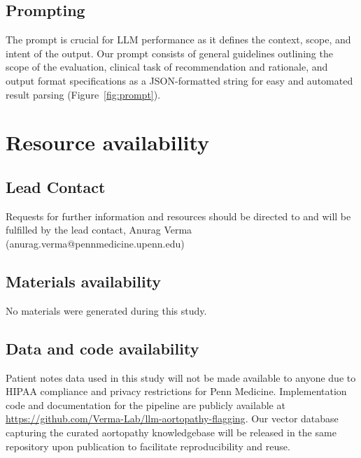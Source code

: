 \documentclass[fleqn,10pt]{wlscirep}
\begin{document}
\subsection*{Prompting}


The prompt is crucial for LLM performance as it defines the context, scope, and intent of the output. Our prompt consists of general guidelines outlining the scope of the evaluation,  clinical task of recommendation and rationale, and output format specifications as a JSON-formatted string for easy and automated result parsing (Figure~\ref{fig:prompt}). 



\section*{Resource availability}

\subsection*{Lead Contact}
Requests for further information and resources should be directed to and will be fulfilled by the lead contact, Anurag Verma (anurag.verma@pennmedicine.upenn.edu)

\subsection*{Materials availability}
No materials were generated during this study. 

\subsection*{Data and code availability}
Patient notes data used in this study will not be made available to anyone due to HIPAA compliance and privacy restrictions for Penn Medicine. Implementation code and documentation for the pipeline are publicly available at \url{https://github.com/Verma-Lab/llm-aortopathy-flagging}. Our vector database capturing the curated aortopathy knowledgebase will be released in the same repository upon publication to facilitate reproducibility and reuse.


\end{document}
